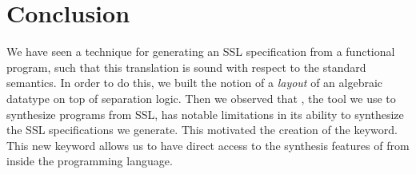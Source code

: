 \section{Conclusion}
\label{sec:conclusion}

We have seen a technique for generating an SSL specification from a functional program, such that this translation is sound with respect to the standard semantics. In order to do this, we built the notion of a \textit{layout} of an algebraic datatype on top of separation logic. Then we observed that \SuSLik, the tool we use to synthesize programs from SSL, has notable limitations in its ability to synthesize the SSL specifications we generate. This motivated the creation of the \synth{} keyword. This new keyword allows us to have direct access to the synthesis features of \SuSLik{} from inside the \Pika{} programming language.

